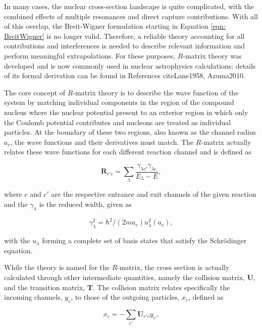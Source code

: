 In many cases, the nuclear cross-section landscape is quite complicated, with the combined effects of multiple resonances and direct capture contributions. With all of this overlap, the Breit-Wigner formulation starting in Equation \ref{eqn: BreitWigner} is no longer valid. Therefore, a reliable theory accounting for all contributions and interferences is needed to describe relevant information and perform meaningful extrapolations. For these purposes, $R$-matrix theory was developed and is now commonly used in nuclear astrophysics calculations; details of its formal derivation can be found in References cite{Lane1958, Azuma2010}. 

The core concept of $R$-matrix theory is to describe the wave function of the system by matching individual components in the region of the compound nucleus where the nuclear potential present to an exterior region in which only the Coulomb potential contributes and nucleons are treated as individual particles. At the boundary of these two regions, also known as the channel radius $a_{c}$, the wave functions and their derivatives must match. The $R$-matrix actually relates these wave functions for each different reaction channel and is defined as

\begin{equation}
\mathbf{R}_{c' c} =  \sum_\lambda \frac{\gamma_{\lambda c'}\gamma_{\lambda c}}{E_\lambda-E},
\label{eqn: Rmatrix}
\end{equation}

\noindent where $c$ and $c'$ are the respective entrance and exit channels of the given reaction and the $\gamma_{\lambda}$ is the reduced width, given as

\begin{equation}
\gamma_\lambda^2 = \hbar^2/(2m a_c)u_\lambda^2(a_c),
\end{equation}

\noindent with the $u_{\lambda}$ forming a complete set of basis states that satisfy the Schr\"odinger  equation. 


While the theory is named for the $R$-matrix, the cross section is actually calculated through other intermediate quantities, namely the collision matrix, $\mathbf{U}$, and the transition matrix, $\mathbf{T}$. The collision matrix relates specifically the incoming channels, $y_{c}$, to those of the outgoing particles, $x_{c}$, defined as

\begin{equation}
x_{c} = - \sum_{c'} \mathbf{U}_{c' c} y_{c'}.
\end{equation}

